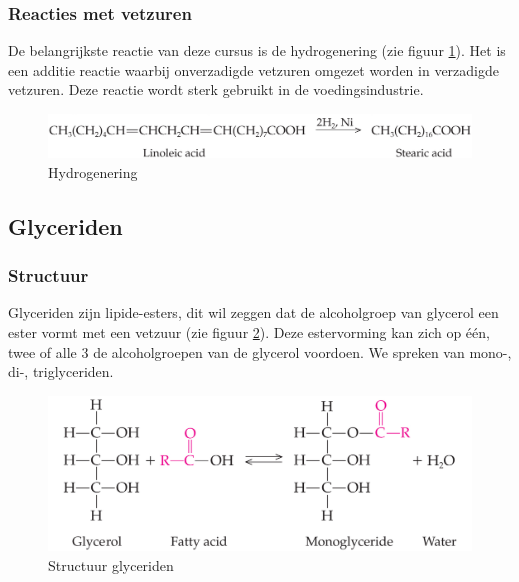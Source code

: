\documentclass[a4paper,kul]{kulakarticle} %
\begin{document}
\subsubsection{Reacties met vetzuren}
De belangrijkste reactie van deze cursus is de hydrogenering (zie figuur \ref{fig:hydrogenering}). Het is een additie reactie waarbij onverzadigde vetzuren omgezet worden in verzadigde vetzuren. Deze reactie wordt sterk gebruikt in de voedingsindustrie.
\begin{figure}[h]
	\centering
	\includegraphics[width=0.7\linewidth]{hydrogenering}
	\caption[Hydrogenering]{Hydrogenering}
	\label{fig:hydrogenering}
\end{figure}
\subsection{Glyceriden}
\subsubsection{Structuur}
Glyceriden zijn lipide-esters, dit wil zeggen dat de alcoholgroep van glycerol een ester vormt met een vetzuur (zie figuur \ref{fig:structuurglyceriden}). Deze estervorming kan zich op één, twee of alle 3 de alcoholgroepen van de glycerol voordoen. We spreken van mono-, di-, triglyceriden.
\begin{figure}[h]
	\centering
	\includegraphics[width=0.6\linewidth]{structuur_glyceriden}
	\caption[Structuur glyceriden]{Structuur glyceriden}
	\label{fig:structuurglyceriden}
\end{figure}
\end{document}
